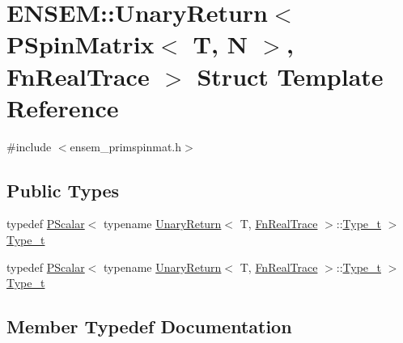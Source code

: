 \hypertarget{structENSEM_1_1UnaryReturn_3_01PSpinMatrix_3_01T_00_01N_01_4_00_01FnRealTrace_01_4}{}\section{E\+N\+S\+EM\+:\+:Unary\+Return$<$ P\+Spin\+Matrix$<$ T, N $>$, Fn\+Real\+Trace $>$ Struct Template Reference}
\label{structENSEM_1_1UnaryReturn_3_01PSpinMatrix_3_01T_00_01N_01_4_00_01FnRealTrace_01_4}


{\ttfamily \#include $<$ensem\+\_\+primspinmat.\+h$>$}

\subsection*{Public Types}
\begin{DoxyCompactItemize}
\item 
typedef \mbox{\hyperlink{classENSEM_1_1PScalar}{P\+Scalar}}$<$ typename \mbox{\hyperlink{structENSEM_1_1UnaryReturn}{Unary\+Return}}$<$ T, \mbox{\hyperlink{structENSEM_1_1FnRealTrace}{Fn\+Real\+Trace}} $>$\+::\mbox{\hyperlink{structENSEM_1_1UnaryReturn_3_01PSpinMatrix_3_01T_00_01N_01_4_00_01FnRealTrace_01_4_a7a7a0fb32831cb5d3323377a17f96cdd}{Type\+\_\+t}} $>$ \mbox{\hyperlink{structENSEM_1_1UnaryReturn_3_01PSpinMatrix_3_01T_00_01N_01_4_00_01FnRealTrace_01_4_a7a7a0fb32831cb5d3323377a17f96cdd}{Type\+\_\+t}}
\item 
typedef \mbox{\hyperlink{classENSEM_1_1PScalar}{P\+Scalar}}$<$ typename \mbox{\hyperlink{structENSEM_1_1UnaryReturn}{Unary\+Return}}$<$ T, \mbox{\hyperlink{structENSEM_1_1FnRealTrace}{Fn\+Real\+Trace}} $>$\+::\mbox{\hyperlink{structENSEM_1_1UnaryReturn_3_01PSpinMatrix_3_01T_00_01N_01_4_00_01FnRealTrace_01_4_a7a7a0fb32831cb5d3323377a17f96cdd}{Type\+\_\+t}} $>$ \mbox{\hyperlink{structENSEM_1_1UnaryReturn_3_01PSpinMatrix_3_01T_00_01N_01_4_00_01FnRealTrace_01_4_a7a7a0fb32831cb5d3323377a17f96cdd}{Type\+\_\+t}}
\end{DoxyCompactItemize}


\subsection{Member Typedef Documentation}
\mbox{\label{structENSEM_1_1UnaryReturn_3_01PSpinMatrix_3_01T_00_01N_01_4_00_01FnRealTrace_01_4_a7a7a0fb32831cb5d3323377a17f96cdd}} 
